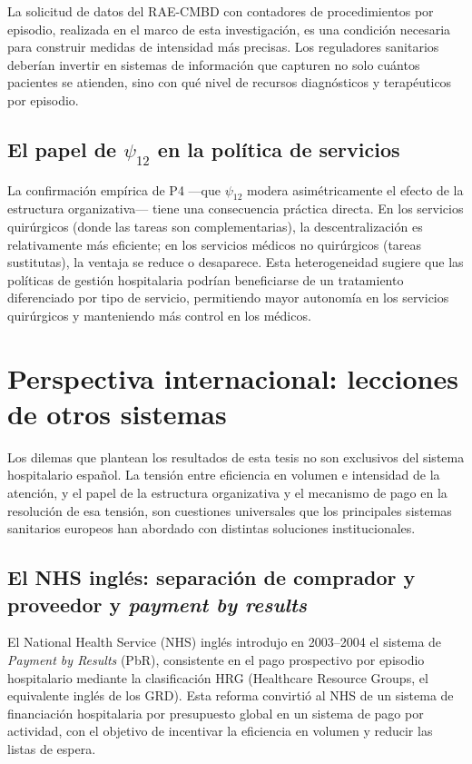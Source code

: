 La solicitud de datos del RAE-CMBD con contadores de procedimientos por episodio, realizada en el marco de esta investigación, es una condición necesaria para construir medidas de intensidad más precisas. Los reguladores sanitarios deberían invertir en sistemas de información que capturen no solo cuántos pacientes se atienden, sino con qué nivel de recursos diagnósticos y terapéuticos por episodio.

\subsection{El papel de \texorpdfstring{$\psi_{12}$}{psi\_12} en la política de servicios}

La confirmación empírica de P4 ---que $\psi_{12}$ modera asimétricamente el efecto de la estructura organizativa--- tiene una consecuencia práctica directa. En los servicios quirúrgicos (donde las tareas son complementarias), la descentralización es relativamente más eficiente; en los servicios médicos no quirúrgicos (tareas sustitutas), la ventaja se reduce o desaparece. Esta heterogeneidad sugiere que las políticas de gestión hospitalaria podrían beneficiarse de un tratamiento diferenciado por tipo de servicio, permitiendo mayor autonomía en los servicios quirúrgicos y manteniendo más control en los médicos.

\section{Perspectiva internacional: lecciones de otros sistemas}
\label{sec:perspectiva_internacional}

Los dilemas que plantean los resultados de esta tesis no son exclusivos del sistema hospitalario español. La tensión entre eficiencia en volumen e intensidad de la atención, y el papel de la estructura organizativa y el mecanismo de pago en la resolución de esa tensión, son cuestiones universales que los principales sistemas sanitarios europeos han abordado con distintas soluciones institucionales.

\subsection{El NHS inglés: separación de comprador y proveedor y \textit{payment by results}}

El National Health Service (NHS) inglés introdujo en 2003--2004 el sistema de \textit{Payment by Results} (PbR), consistente en el pago prospectivo por episodio hospitalario mediante la clasificación HRG (Healthcare Resource Groups, el equivalente inglés de los GRD). Esta reforma convirtió al NHS de un sistema de financiación hospitalaria por presupuesto global en un sistema de pago por actividad, con el objetivo de incentivar la eficiencia en volumen y reducir las listas de espera.

